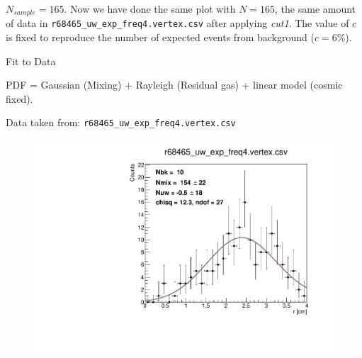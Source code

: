 \documentclass[9pt]{beamer}
\newcommand{\nologo}{\setbeamertemplate{logo}{}}
\begin{document}
{\nologo
\begin{frame}{$N_{sample} = 165$.}
Now we have done the same plot with $N = 165$, the same amount of data in \texttt{r68465\_uw\_exp\_freq4.vertex.csv} after applying \textit{cut1}. The value of $c$ is fixed to reproduce the number of expected events from background ($c = 6\%$).
\begin{figure}
\end{figure}
\end{frame}
}
\begin{frame}{Fit to Data}

PDF = Gaussian (Mixing) + Rayleigh (Residual gas) + linear model (cosmic fixed).

Data taken from: \texttt{r68465\_uw\_exp\_freq4.vertex.csv}

\begin{figure}[hbtp]
\centering
\includegraphics[width = 0.65 \textwidth]{./SingleModel/TuttoAnalitico.pdf}
\end{figure}
\end{frame}
\end{document}

